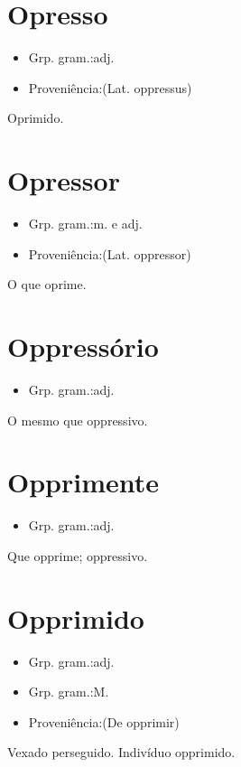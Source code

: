 \section{Opresso}
\begin{itemize}
\item {Grp. gram.:adj.}
\end{itemize}
\begin{itemize}
\item {Proveniência:(Lat. \textunderscore oppressus\textunderscore )}
\end{itemize}
Oprimido.
\section{Opressor}
\begin{itemize}
\item {Grp. gram.:m.  e  adj.}
\end{itemize}
\begin{itemize}
\item {Proveniência:(Lat. \textunderscore oppressor\textunderscore )}
\end{itemize}
O que oprime.
\section{Oppressório}
\begin{itemize}
\item {Grp. gram.:adj.}
\end{itemize}
O mesmo que \textunderscore oppressivo\textunderscore .
\section{Opprimente}
\begin{itemize}
\item {Grp. gram.:adj.}
\end{itemize}
Que opprime; oppressivo.
\section{Opprimido}
\begin{itemize}
\item {Grp. gram.:adj.}
\end{itemize}
\begin{itemize}
\item {Grp. gram.:M.}
\end{itemize}
\begin{itemize}
\item {Proveniência:(De \textunderscore opprimir\textunderscore )}
\end{itemize}
Vexado perseguido.
Indivíduo opprimido.
